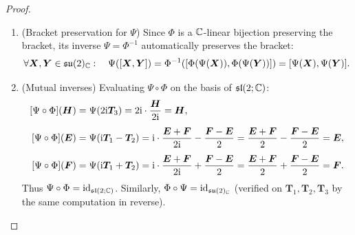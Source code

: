 \documentclass[11pt,reqno]{amsart}
\newcommand{\ii}{\mathrm{i}}
\begin{document}
\begin{proof}
\begin{enumerate}
\item (Bracket preservation for $\Psi$)
Since $\Phi$ is a $\mathbb{C}$-linear bijection preserving the bracket,
its inverse $\Psi=\Phi^{-1}$ automatically preserves the bracket:
\[
\forall\bm X,\bm Y\in\su(2)_\C:\quad
\Psi\Br{\SqBr{\bm X,\bm Y}}
=\Phi^{-1}\Br{\SqBr{\Phi(\Psi(\bm X)),\Phi(\Psi(\bm Y))}}
=\SqBr{\Psi(\bm X),\Psi(\bm Y)}.
\]

\item (Mutual inverses)
Evaluating $\Psi\circ\Phi$ on the basis of $\mathfrak{sl}(2;\mathbb{C})$:
\[
\begin{aligned}
\FUNC{\Psi\circ\Phi}{\bm H}
&=\Psi(2\ii\bm T_3)
=2\ii\cdot\frac{\bm H}{2\ii}=\bm H, \\[4pt]
\FUNC{\Psi\circ\Phi}{\bm E}
&=\Psi\Br{\ii\bm T_1-\bm T_2}
=\ii\cdot\frac{\bm E+\bm F}{2\ii}-\frac{\bm F-\bm E}{2}
=\frac{\bm E+\bm F}{2}-\frac{\bm F-\bm E}{2}
=\bm E, \\[4pt]
\FUNC{\Psi\circ\Phi}{\bm F}
&=\Psi\Br{\ii\bm T_1+\bm T_2}
=\ii\cdot\frac{\bm E+\bm F}{2\ii}+\frac{\bm F-\bm E}{2}
=\frac{\bm E+\bm F}{2}+\frac{\bm F-\bm E}{2}
=\bm F.
\end{aligned}
\]
Thus $\Psi\circ\Phi=\mathrm{id}_{\mathfrak{sl}(2;\mathbb{C})}$.
Similarly, $\Phi\circ\Psi=\mathrm{id}_{\mathfrak{su}(2)_{\mathbb{C}}}$ (verified on
$\bm T_1,\bm T_2,\bm T_3$ by the same computation in reverse).

\end{enumerate}
\end{proof}
\end{document}
